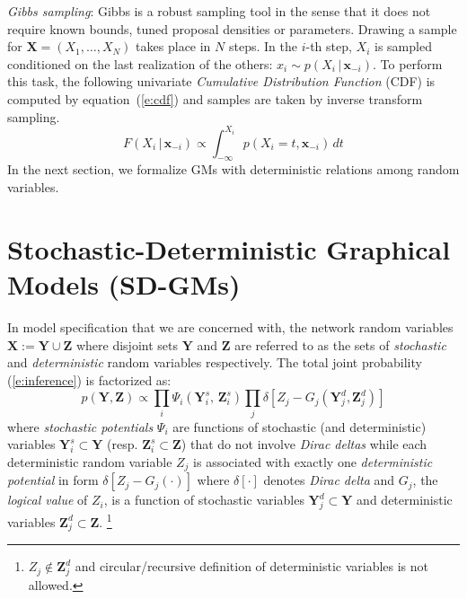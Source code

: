 \documentclass{article}
\newcommand{\bvec}[1]{\textbf{#1}}
\newcommand{\pr}{p}
\begin{document}
\emph{Gibbs sampling}:
Gibbs is a robust sampling tool in the sense that it does not require known bounds, tuned proposal densities or parameters.
Drawing a sample for $\bvec{X} = (X_1, \ldots, X_N)$ takes place in $N$ steps.
In the $i$-th step, $X_i$ is sampled conditioned on the last realization of the others:
$x_i \sim \pr(X_i \,|\, \bvec{x}_{-i})$. 
To perform this task, the following univariate \emph{Cumulative Distribution Function} (CDF)
is computed by equation~(\ref{e:cdf}) and samples are taken by inverse transform sampling. 
{\footnotesize
\begin{equation}
\label{e:cdf}
F(X_i  \,|\, \bvec{x}_{-i}) 
\propto
\int_{-\infty}^{X_i} \!\!\!\! \pr(X_i = t, \bvec{x}_{-i}) \, d  t
\end{equation} 
}
In the next section, we formalize GMs with deterministic relations among random variables. 
\section{Stochastic-Deterministic Graphical Models (SD-GMs)}
\label{sect:contribution1}
In model specification that we are concerned with,
the network random variables $\bvec{X} := \bvec{Y} \cup \bvec{Z}$
where disjoint sets $\bvec{Y}$ and $\bvec{Z}$ are referred to as the sets of \emph{stochastic} and \emph{deterministic}  random variables respectively. 
The total joint probability (\ref{e:inference}) is factorized as:
\begin{equation}
\label{e:infer.sd}
\pr(\bvec{Y}, \bvec{Z}) \propto 
\prod_{i} \Psi_i (\bvec{Y}^s_i, \, \bvec{Z}^s_i)
\prod_j \delta[
Z_j - G_j(\bvec{Y}^d_j, \bvec{Z}^d_j)
]
\end{equation}
where \emph{stochastic potentials} $\Psi_i$ are functions 
of stochastic (and deterministic) variables 
$\bvec{Y}^s_i \subset \bvec{Y}$ 
(resp. $\bvec{Z}^s_i \subset \bvec{Z}$) that do not involve 
\emph{Dirac deltas} while 
each deterministic random variable $Z_j$ 
is associated with exactly one 
\emph{deterministic potential} in form 
$\delta[Z_j - G_j(\cdot)]$ 
 where $\delta[\cdot]$ denotes \emph{Dirac delta} and $G_j$, the \emph{logical value} of $Z_i$,  is a function of 
stochastic variables $\bvec{Y}_j^d \subset \bvec{Y}$ and deterministic variables $\bvec{Z}_j^d \subset \bvec{Z}$. 
\footnote{
$Z_j \not \in \bvec{Z}_j^d$ 
and circular/recursive definition of deterministic variables is not allowed. }
\end{document}

